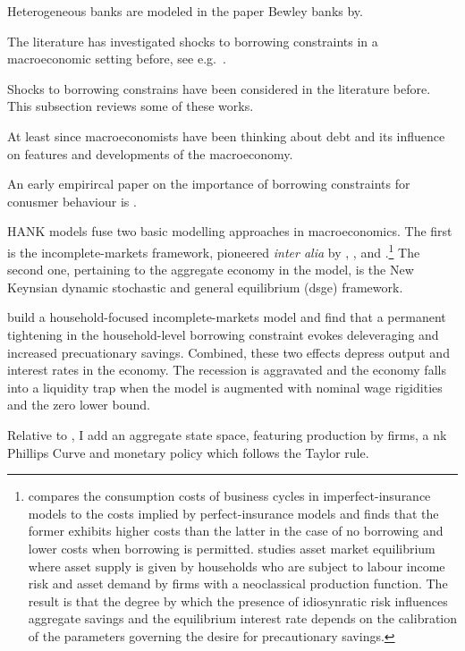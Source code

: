 \documentclass[12pt]{article} %
\numberwithin{equation}{section} %
\begin{document}
Heterogeneous banks are modeled in the paper Bewley banks by.

The literature has investigated shocks to borrowing constraints in a macroeconomic setting before, see e.g.~\textcite{kv2018}. 

Shocks to borrowing constrains have been considered in the literature before. This subsection reviews some of these works.

At least since \textcite{fisher1933} macroeconomists have been thinking about debt and its influence on features and developments of the macroeconomy.

An early empirircal paper on the importance of borrowing constraints for conusmer behaviour is \textcite{gross2002}.

HANK models fuse two basic modelling approaches in macroeconomics. The first is the incomplete-markets framework, pioneered \textit{inter alia} by \textcite{bewley1986}, \textcite{im1989}, \textcite{huggett1993} and \textcite{aiyagari1994}.\footnote{\textcite{im1989} compares the consumption costs of business cycles in imperfect-insurance models to the costs implied by perfect-insurance models and finds that the former exhibits higher costs than the latter in the case of no borrowing and lower costs when borrowing is permitted. \textcite{aiyagari1994} studies asset market equilibrium where asset supply is given by households who are subject to labour income risk and asset demand by firms with a neoclassical production function. The result is that the degree by which the presence of idiosynratic risk influences aggregate savings and the equilibrium interest rate depends on the calibration of the parameters governing the desire for precautionary savings.} The second one, pertaining to the aggregate economy in the model, is the New Keynsian dynamic stochastic and general equilibrium (\Gls{dsge}) framework.

\textcite{gl2017} build a household-focused incomplete-markets model and find that a permanent tightening in the household-level borrowing constraint evokes deleveraging and increased precuationary savings. Combined, these two effects depress output and interest rates in the economy. The recession is aggravated and the economy falls into a liquidity trap when the model is augmented with nominal wage rigidities and the zero lower bound. 

Relative to \textcite{gl2017}, I add an aggregate state space, featuring production by firms, a \Gls{nk} Phillips Curve and monetary policy which follows the Taylor rule.
\end{document}
